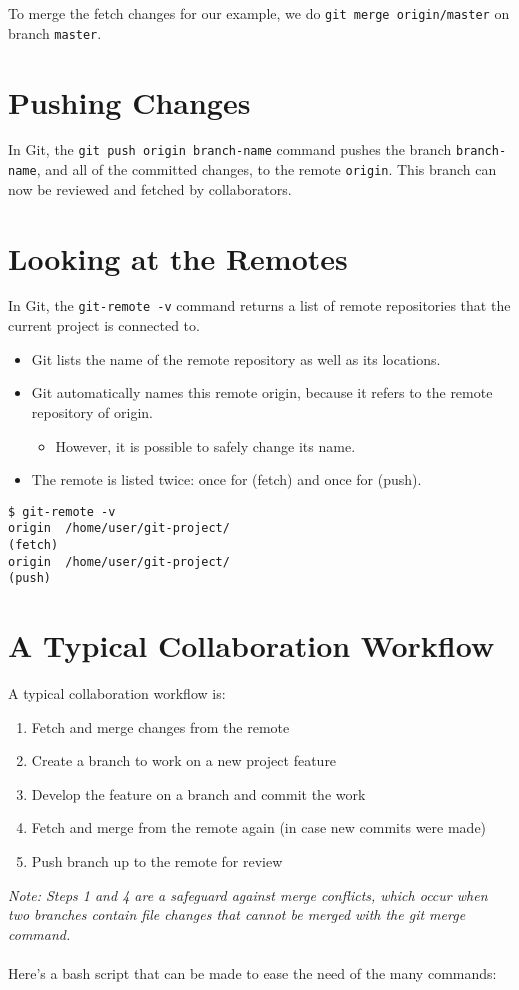 To merge the fetch changes for our example, we do \verb!git merge origin/master! on branch \verb!master!. 

\section{Pushing Changes}
In Git, the \verb!git push origin branch-name! command pushes the branch \verb!branch-name!, and all of the committed changes, 
to the remote \verb!origin!. This branch can now be reviewed and fetched by collaborators.

\section{Looking at the Remotes}
In Git, the \verb!git-remote -v! command returns a list of remote repositories that the current project is connected to.
\begin{itemize}
    \item Git lists the name of the remote repository as well as its locations.
    \item Git automatically names this remote origin, because it refers to the remote repository of origin.
        \begin{itemize}
            \item However, it is possible to safely change its name.
        \end{itemize}
    \item The remote is listed twice: once for (fetch) and once for (push).
\end{itemize}

\begin{verbatim}
$ git-remote -v 
origin  /home/user/git-project/
(fetch)
origin  /home/user/git-project/
(push)
\end{verbatim}
        
    
\section{A Typical Collaboration Workflow}
A typical collaboration workflow is:
\begin{enumerate}
    \item Fetch and merge changes from the remote
    \item Create a branch to work on a new project feature
    \item Develop the feature on a branch and commit the work
    \item Fetch and merge from the remote again (in case new commits were made)
    \item Push branch up to the remote for review
\end{enumerate}
\textit{Note: Steps 1 and 4 are a safeguard against merge conflicts, which occur when two branches contain file changes that cannot be merged with the git merge command.}
\\\\
Here's a bash script that can be made to ease the need of the many commands: 

